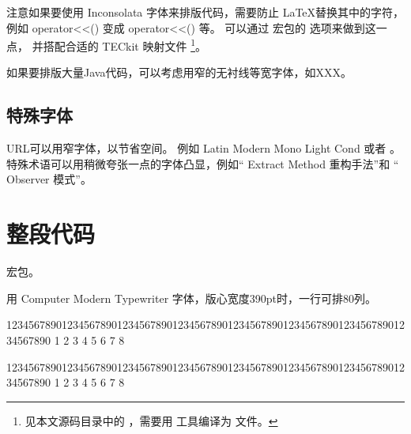 注意如果要使用 Inconsolata 字体来排版代码，需要防止 \LaTeX 替换其中的字符，
例如 { operator<<()} 变成 { operator<<()} 等。
可以通过  宏包的  选项来做到这一点，
并搭配合适的 TECkit 映射文件
\footnote{见本文源码目录中的 ，需要用  工具编译为  文件。}。


如果要排版大量Java代码，可以考虑用窄的无衬线等宽字体，如XXX。

\subsection{特殊字体}
URL可以用窄字体，以节省空间。
例如 { Latin Modern Mono Light Cond} 或者 。
特殊术语可以用稍微夸张一点的字体凸显，例如“{ Extract Method} 重构手法”和
“{ Observer} 模式”。

\section{整段代码}
 宏包。

用 Computer Modern Typewriter 字体，版心宽度390pt时，一行可排80列。
\begin{Code}
12345678901234567890123456789012345678901234567890123456789012345678901234567890
         1         2         3         4         5         6         7         8
\end{Code}

\begin{Code}
12345678901234567890123456789012345678901234567890123456789012345678901234567890
         1         2         3         4         5         6         7         8
\end{Code}